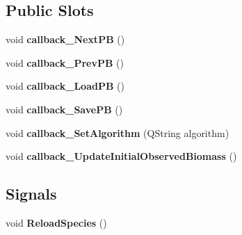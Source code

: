 \subsection*{Public Slots}
\begin{DoxyCompactItemize}
\item 
void {\bfseries callback\+\_\+\+Next\+PB} ()\hypertarget{classnmf_estimation___tab5_af379819acfabded6d10e0ae013468c49}{}\label{classnmf_estimation___tab5_af379819acfabded6d10e0ae013468c49}

\item 
void {\bfseries callback\+\_\+\+Prev\+PB} ()\hypertarget{classnmf_estimation___tab5_ad2dd05d2d965eeedc2faf2f476f183ba}{}\label{classnmf_estimation___tab5_ad2dd05d2d965eeedc2faf2f476f183ba}

\item 
void {\bfseries callback\+\_\+\+Load\+PB} ()\hypertarget{classnmf_estimation___tab5_ac4f696c9fc9816ce8c4aaab1c6d6248e}{}\label{classnmf_estimation___tab5_ac4f696c9fc9816ce8c4aaab1c6d6248e}

\item 
void {\bfseries callback\+\_\+\+Save\+PB} ()\hypertarget{classnmf_estimation___tab5_a916bfd238c215efec4592bdd122a9b25}{}\label{classnmf_estimation___tab5_a916bfd238c215efec4592bdd122a9b25}

\item 
void {\bfseries callback\+\_\+\+Set\+Algorithm} (Q\+String algorithm)\hypertarget{classnmf_estimation___tab5_aac14ac42066570e545a68596d056230b}{}\label{classnmf_estimation___tab5_aac14ac42066570e545a68596d056230b}

\item 
void {\bfseries callback\+\_\+\+Update\+Initial\+Observed\+Biomass} ()\hypertarget{classnmf_estimation___tab5_a040ea1a551c45f77d03bba8305cb9b49}{}\label{classnmf_estimation___tab5_a040ea1a551c45f77d03bba8305cb9b49}

\end{DoxyCompactItemize}
\subsection*{Signals}
\begin{DoxyCompactItemize}
\item 
void {\bfseries Reload\+Species} ()\hypertarget{classnmf_estimation___tab5_a294c657999cfbbcad8aec90b566a84f9}{}\label{classnmf_estimation___tab5_a294c657999cfbbcad8aec90b566a84f9}

\end{DoxyCompactItemize}
